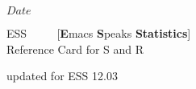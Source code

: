\documentclass[a4paper]{article}
\begin{document}
\SVN $Date$
\begin{center}
  {\LARGE ESS \ \ \ \ {\large
      [\textbf{E}macs \textbf{S}peaks \textbf{Statistics}]}
      \\[.5ex] Reference Card for S and R}

  \smallskip

  {\small updated for ESS 12.03}%
  \\[1ex] {\tiny \SVNDate}
\end{center}
\end{document}
